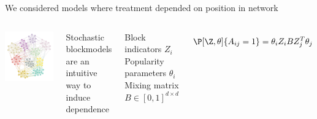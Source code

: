 \documentclass[aspectratio=169]{beamer}
\theoremstyle{remark}
\begin{document}
\begin{frame}{We considered models where treatment depended on position in network}
    
    \begin{columns}
        \centering
        \includegraphics[width=\textwidth]{./figures/assortative.png}
        
        Stochastic blockmodels are an intuitive way to induce dependence \\
        \vspace{4mm}
        
        Block indicators $Z_i$ \\
        Popularity parameters $\theta_i$ \\
        Mixing matrix $B \in [0, 1]^{d \times d}$
        
        \begin{equation*}
            \P[\Z, \theta]{A_{ij} = 1} = \theta_i Z_i B Z_j^T \theta_j
        \end{equation*}
    \end{columns}
\end{frame}
\end{document}
